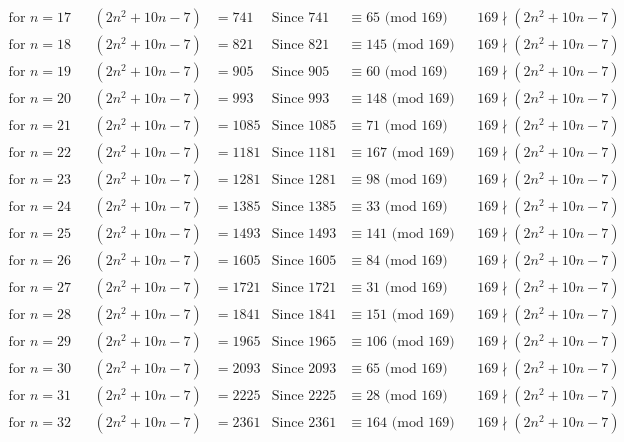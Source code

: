 \documentclass[12pt]{article}
\begin{document}
\begin{align*}
\text{for $n = 17 $}&& (2n^2+10n-7) &= 741 & \text{Since } 741  &\equiv  65 \text{ (mod $169$)}&& 169 \nmid (2n^2+10n-7)\\
\text{for $n = 18 $}&& (2n^2+10n-7) &= 821 & \text{Since } 821  &\equiv  145 \text{ (mod $169$)}&& 169 \nmid (2n^2+10n-7)\\
\text{for $n = 19 $}&& (2n^2+10n-7) &= 905 & \text{Since } 905  &\equiv  60 \text{ (mod $169$)}&& 169 \nmid (2n^2+10n-7)\\
\text{for $n = 20 $}&& (2n^2+10n-7) &= 993 & \text{Since } 993  &\equiv  148 \text{ (mod $169$)}&& 169 \nmid (2n^2+10n-7)\\
\text{for $n = 21 $}&& (2n^2+10n-7) &= 1085 & \text{Since } 1085  &\equiv  71 \text{ (mod $169$)}&& 169 \nmid (2n^2+10n-7)\\
\text{for $n = 22 $}&& (2n^2+10n-7) &= 1181 & \text{Since } 1181  &\equiv  167 \text{ (mod $169$)}&& 169 \nmid (2n^2+10n-7)\\
\text{for $n = 23 $}&& (2n^2+10n-7) &= 1281 & \text{Since } 1281  &\equiv  98 \text{ (mod $169$)}&& 169 \nmid (2n^2+10n-7)\\
\text{for $n = 24 $}&& (2n^2+10n-7) &= 1385 & \text{Since } 1385  &\equiv  33 \text{ (mod $169$)}&& 169 \nmid (2n^2+10n-7)\\
\text{for $n = 25 $}&& (2n^2+10n-7) &= 1493 & \text{Since } 1493  &\equiv  141 \text{ (mod $169$)}&& 169 \nmid (2n^2+10n-7)\\
\text{for $n = 26 $}&& (2n^2+10n-7) &= 1605 & \text{Since } 1605  &\equiv  84 \text{ (mod $169$)}&& 169 \nmid (2n^2+10n-7)\\
\text{for $n = 27 $}&& (2n^2+10n-7) &= 1721 & \text{Since } 1721  &\equiv  31 \text{ (mod $169$)}&& 169 \nmid (2n^2+10n-7)\\
\text{for $n = 28 $}&& (2n^2+10n-7) &= 1841 & \text{Since } 1841  &\equiv  151 \text{ (mod $169$)}&& 169 \nmid (2n^2+10n-7)\\
\text{for $n = 29 $}&& (2n^2+10n-7) &= 1965 & \text{Since } 1965  &\equiv  106 \text{ (mod $169$)}&& 169 \nmid (2n^2+10n-7)\\
\text{for $n = 30 $}&& (2n^2+10n-7) &= 2093 & \text{Since } 2093  &\equiv  65 \text{ (mod $169$)}&& 169 \nmid (2n^2+10n-7)\\
\text{for $n = 31 $}&& (2n^2+10n-7) &= 2225 & \text{Since } 2225  &\equiv  28 \text{ (mod $169$)}&& 169 \nmid (2n^2+10n-7)\\
\text{for $n = 32 $}&& (2n^2+10n-7) &= 2361 & \text{Since } 2361  &\equiv  164 \text{ (mod $169$)}&& 169 \nmid (2n^2+10n-7)\\

\end{align*}
\end{document}
